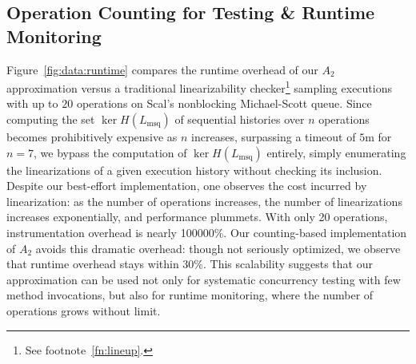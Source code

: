 \subsection{Operation Counting for Testing \& Runtime Monitoring}
\label{sec:exp:dynamic}

Figure~\ref{fig:data:runtime} compares the runtime overhead of our $A_2$
approximation versus a traditional linearizability checker\footnote{See
footnote~\ref{fn:lineup}.} sampling executions with up to $20$ operations on
Scal's nonblocking Michael-Scott queue. Since computing the set $\ker
H(L_\mathrm{msq})$ of sequential histories over $n$ operations becomes
prohibitively expensive as $n$ increases, surpassing a timeout of $5$m for
$n\!=\!7$, we bypass the computation of $\ker H(L_\mathrm{msq})$ entirely,
simply enumerating the linearizations of a given execution history without
checking its inclusion. Despite our best-effort implementation, one observes
the cost incurred by linearization: as the number of operations increases, the
number of linearizations increases exponentially, and performance plummets.
With only 20 operations, instrumentation overhead is nearly 100000\%. Our
counting-based implementation of $A_2$ avoids this dramatic overhead: though
not seriously optimized, we observe that runtime overhead stays within 30\%.
This scalability suggests that our approximation can be used not only for
systematic concurrency testing with few method invocations, but also for
runtime monitoring, where the number of operations grows without limit.

